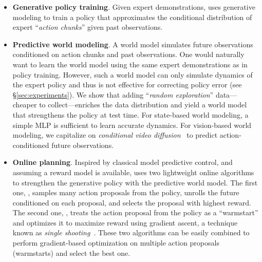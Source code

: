 \begin{itemize}
    \item \textbf{Generative policy training}. Given expert demonstrations, \nameshort uses generative modeling to train a policy that approximates the conditional distribution of expert ``\emph{action chunks}'' given past observations. 
    \item \textbf{Predictive world modeling}. A world model simulates future observations conditioned on action chunks and past observations. One would naturally want to learn the world model using the same expert demonstrations as in policy training. However, {such a world model can only simulate dynamics of the expert policy and thus is not effective for correcting policy error} 
    (see \S\ref{sec:experiments}). 
    We show that adding ``\emph{random exploration}'' data---cheaper to collect---enriches the data distribution and yield a world model that strengthens the policy at test time. For state-based world modeling, a simple MLP is sufficient to learn accurate dynamics. For vision-based world modeling, we capitalize on \emph{conditional video diffusion}~\cite{ho2022video,alonso2024diffusion} to predict action-conditioned future observations.
    \item \textbf{Online planning}. Inspired by classical model predictive control, and assuming a reward model is available, \nameshort uses two lightweight online algorithms to strengthen the generative policy with the predictive world model. The first one, \gpcrank, samples many action proposals from the policy, unrolls the future conditioned on each proposal, and selects the proposal with highest reward. The second one, \gpcopt, treats the action proposal from the policy as a ``warmstart'' and optimizes it to maximize reward using gradient ascent, a technique known as \emph{single shooting}~\cite{diehl2011numerical}. These two algorithms can be easily combined to perform gradient-based optimization on multiple action proposals (warmstarts) and select the best one.
\end{itemize}

